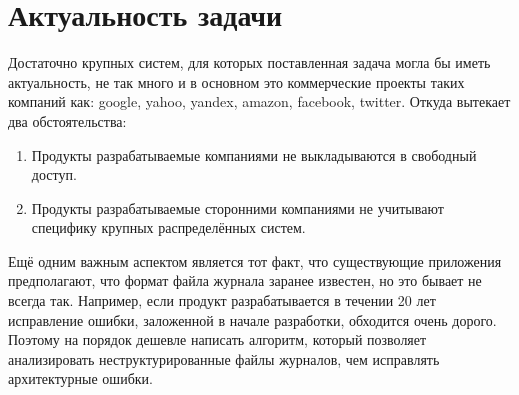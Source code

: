 \section{Актуальность задачи}
Достаточно крупных систем, для которых поставленная задача могла бы иметь
актуальность, не так много и в основном это коммерческие проекты таких
компаний как: google, yahoo, yandex, amazon, facebook, twitter.
Откуда вытекает два обстоятельства:
\begin{enumerate}
  \item Продукты разрабатываемые компаниями не выкладываются в свободный доступ.
  \item Продукты разрабатываемые сторонними компаниями не учитывают специфику
    крупных распределённых систем.
\end{enumerate}
Ещё одним важным аспектом является тот факт, что существующие приложения
предполагают, что формат файла журнала заранее известен, но это бывает не
всегда так. Например, если продукт разрабатывается в течении 20 лет
исправление ошибки, заложенной в начале разработки, обходится очень дорого.
Поэтому на порядок дешевле написать алгоритм, который позволяет анализировать
неструктурированные файлы журналов, чем исправлять архитектурные ошибки.


